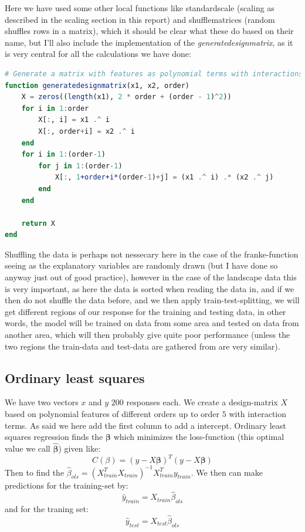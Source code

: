 \documentclass{article}
\begin{document}
Here we have used some other local functions like standardscale (scaling as
described in the scaling section in this report) and shufflematrices (random
shuffles rows in a matrix), which it should be clear what these do based on
their name, but I'll also include the implementation of the
\textit{generatedesignmatrix}, as it is very central for all the calculations we
have done:
\begin{lstlisting}[language=julia]
# Generate a matrix with features as polynomial terms with interactions
function generatedesignmatrix(x1, x2, order)
    X = zeros((length(x1), 2 * order + (order - 1)^2))
    for i in 1:order
        X[:, i] = x1 .^ i
        X[:, order+i] = x2 .^ i
    end
    for i in 1:(order-1)
        for j in 1:(order-1)
            X[:, 1+order+i*(order-1)+j] = (x1 .^ i) .* (x2 .^ j)
        end
    end

    return X
end
\end{lstlisting}

Shuffling the data is perhaps not nessecary here in the case of the
franke-function seeing as the explanatory variables are randomly drawn (but I
have done so anyway just out of good practice), however in the case of the
landscape data this is very important, as here the data is sorted when reading
the data in, and if we then do not shuffle the data before, and we then apply
train-test-splitting, we will get different regions of our response for the
training and testing data, in other words, the model will be trained on data
from some area and tested on data from another area, which will then probably
give quite poor performance (unless the two regions the train-data and test-data
are gathered from are very similar).


\subsection{Ordinary least squares}
We have two vectors $x$ and $y$ $200$ responses each. We create a design-matrix
$X$ based on polynomial features of different orders up to order $5$ with
interaction terms. As said we here add the first column to add a intercept.
Ordinary least squares regression finds the $\mathbf{\beta}$ which minimizes the
loss-function (this optimal value we call $\hat{\mathbf{\beta}}$) given like:
$$C(\beta) = (y - X\mathbf{\beta})^T (y - X\mathbf{\beta})$$
Then to find the $\hat{\beta}_{ols} = (X^T_{train} X_{train})^{-1} X^T_{train}
    y_{train}$. We then can make predictions for the training-set by:
$$\hat{y}_{train} = X_{train} \hat{\beta}_{ols}$$
and for the traning set:
$$\hat{y}_{test} = X_{test} \hat{\beta}_{ols}$$
\end{document}
